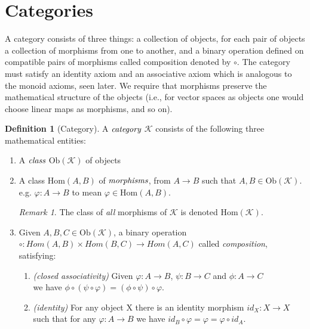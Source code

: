 \documentclass[10pt, oneside, reqno]{amsart}
\theoremstyle{plain}%
\theoremstyle{definition}
\newtheorem{defn}[thm]{Definition}
\theoremstyle{remark}
\newtheorem*{rem}{Remark}
\newcommand{\Cat}{\mathcal{K}}
\newcommand{\Id}{\mathit{id}_}
\begin{document}
\section{Categories} %
\label{sec:categories}
A category consists of three things:
a collection of objects, for each pair of objects a collection of morphisms from one to another, and a binary
operation defined on compatible pairs of morphisms called composition denoted by $\circ$. The category must satisfy an identity axiom
and an associative axiom which is analogous to the monoid axioms, seen later. We require that morphisms preserve the
mathematical structure of the objects (i.e., for vector spaces as objects one would choose linear maps as morphisms, and so on).
\begin{defn}[Category]
	A $\emph{category}$ $\Cat$ consists of the following three mathematical entities:
	\begin{enumerate}
		\item A $\emph{class}$ $\text{Ob}(\Cat)$ of objects
		
		\item A class $\text{Hom}(A,B)$ of $\emph{morphisms}$, from $A \longrightarrow B$ such that $A, B \in \text{Ob}(\Cat)$.
		\\
		e.g. $\varphi : A \to B$ to mean $\varphi \in \text{Hom}(A,B)$.
		\begin{rem}
		The class of \emph{all} morphisms of $\Cat$ is denoted $\text{Hom}(\Cat)$.
		\end{rem}

		\item Given $A, B, C \in \text{Ob}(\Cat)$, a binary operation $\circ : Hom(A,B) \times Hom(B,C) \to Hom(A,C)$ called
		\emph{composition}, satisfying:
		\begin{enumerate}
			\item \emph{(closed associativity)} Given $\varphi : A \to B$, $\psi: B \to C$ and $\phi: A \to C$
			\\
			we have $\phi \circ (\psi \circ \varphi) = (\phi \circ \psi) \circ \varphi$.
			\\
			
			\item \emph{(identity)} For any object X there is an identity morphism $\Id{X} : X \to X$ such that for any $\varphi: A \to B$ we have $\Id{B} \circ \varphi = \varphi = \varphi \circ \Id{A}$.
			\\
		\end{enumerate}
	\end{enumerate}
\end{defn}
\end{document}
